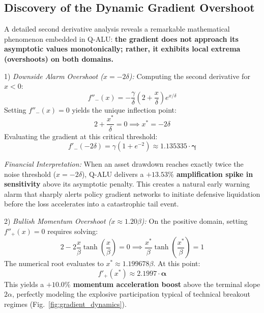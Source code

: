 \documentclass[conference]{IEEEtran}
\begin{document}
\subsection{Discovery of the Dynamic Gradient Overshoot}
A detailed second derivative analysis reveals a remarkable mathematical phenomenon embedded in Q-ALU: \textbf{the gradient does not approach its asymptotic values monotonically; rather, it exhibits local extrema (overshoots) on both domains.}

1) \textit{Downside Alarm Overshoot ($x = -2\delta$):}
Computing the second derivative for $x < 0$:
\begin{equation}
f''_-(x) = -\frac{\gamma}{\delta} \left(2 + \frac{x}{\delta}\right) e^{x/\delta}
\end{equation}
Setting $f''_-(x) = 0$ yields the unique inflection point:
\begin{equation}
2 + \frac{x^*}{\delta} = 0 \implies x^* = -2\delta
\end{equation}
Evaluating the gradient at this critical threshold:
\begin{equation}
f'_-( -2\delta ) = \gamma \left( 1 + e^{-2} \right) \approx \mathbf{1.135335 \cdot \gamma}
\end{equation}

\textit{Financial Interpretation:} When an asset drawdown reaches exactly twice the noise threshold ($x = -2\delta$), Q-ALU delivers a \textbf{$+13.53\%$ amplification spike in sensitivity} above its asymptotic penalty. This creates a natural early warning alarm that sharply alerts policy gradient networks to initiate defensive liquidation before the loss accelerates into a catastrophic tail event.

2) \textit{Bullish Momentum Overshoot ($x \approx 1.20\beta$):}
On the positive domain, setting $f''_+(x) = 0$ requires solving:
\begin{equation}
2 - 2\frac{x}{\beta}\tanh\left(\frac{x}{\beta}\right) = 0 \implies \frac{x^*}{\beta}\tanh\left(\frac{x^*}{\beta}\right) = 1
\end{equation}
The numerical root evaluates to $x^* \approx 1.199678 \beta$. At this point:
\begin{equation}
f'_+(x^*) \approx \mathbf{2.1997 \cdot \alpha}
\end{equation}
This yields a \textbf{$+10.0\%$ momentum acceleration boost} above the terminal slope $2\alpha$, perfectly modeling the explosive participation typical of technical breakout regimes (Fig.~\ref{fig:gradient_dynamics}).
\end{document}
